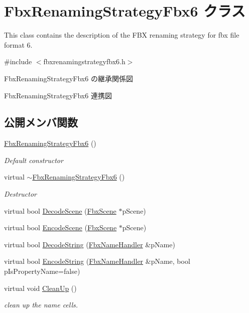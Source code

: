 \hypertarget{class_fbx_renaming_strategy_fbx6}{}\section{Fbx\+Renaming\+Strategy\+Fbx6 クラス}
\label{class_fbx_renaming_strategy_fbx6}


This class contains the description of the F\+BX renaming strategy for fbx file format 6.  




{\ttfamily \#include $<$fbxrenamingstrategyfbx6.\+h$>$}



Fbx\+Renaming\+Strategy\+Fbx6 の継承関係図


Fbx\+Renaming\+Strategy\+Fbx6 連携図
\subsection*{公開メンバ関数}
\begin{DoxyCompactItemize}
\item 
\hyperlink{class_fbx_renaming_strategy_fbx6_a5a90e6b22bb9cb54515a5d39a1635794}{Fbx\+Renaming\+Strategy\+Fbx6} ()
\begin{DoxyCompactList}\small\item\em Default constructor \end{DoxyCompactList}\item 
virtual \hyperlink{class_fbx_renaming_strategy_fbx6_ac6a37d6fb8d2a7604db4b3ed10a834ce}{$\sim$\+Fbx\+Renaming\+Strategy\+Fbx6} ()
\begin{DoxyCompactList}\small\item\em Destructor \end{DoxyCompactList}\item 
virtual bool \hyperlink{class_fbx_renaming_strategy_fbx6_a663b913a3f88b49e847f9c9c99ab16f2}{Decode\+Scene} (\hyperlink{class_fbx_scene}{Fbx\+Scene} $\ast$p\+Scene)
\item 
virtual bool \hyperlink{class_fbx_renaming_strategy_fbx6_a24a48914e694f5bada3b0604a4dc62bf}{Encode\+Scene} (\hyperlink{class_fbx_scene}{Fbx\+Scene} $\ast$p\+Scene)
\item 
virtual bool \hyperlink{class_fbx_renaming_strategy_fbx6_a491fb1e1fe7f2d194059f83f49be9e19}{Decode\+String} (\hyperlink{class_fbx_name_handler}{Fbx\+Name\+Handler} \&p\+Name)
\item 
virtual bool \hyperlink{class_fbx_renaming_strategy_fbx6_aee897659c210920eefbcb899b8b463d6}{Encode\+String} (\hyperlink{class_fbx_name_handler}{Fbx\+Name\+Handler} \&p\+Name, bool p\+Is\+Property\+Name=false)
\item 
virtual void \hyperlink{class_fbx_renaming_strategy_fbx6_acb37bd5bc46fdf1e4bf77d3db6654d45}{Clean\+Up} ()
\begin{DoxyCompactList}\small\item\em clean up the name cells. \end{DoxyCompactList}\end{DoxyCompactItemize}
